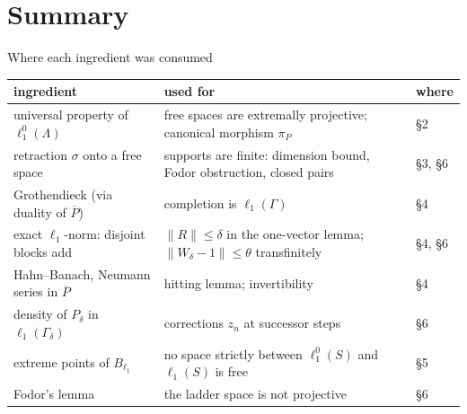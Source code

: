 \documentclass[10pt,aspectratio=169]{beamer}
\newcommand{\lo}[1]{\ell_1^0(#1)}
\newcommand{\ellone}[1]{\ell_1(#1)}
\begin{document}
\section{Summary}

\begin{frame}{Where each ingredient was consumed}
  \small
  \renewcommand{\arraystretch}{1.3}
  \begin{tabular}{@{}p{}p{}p{}@{}}
    \toprule
    ingredient & used for & where\\
    \midrule
    universal property of $\lo\Lambda$ & free spaces are extremally projective;
      canonical morphism $\pi_P$ & \S2\\
    retraction $\sigma$ onto a free space & supports are finite: dimension bound,
      Fodor obstruction, closed pairs & \S3, \S6\\
    Grothendieck (via duality of $\overline P$) & completion is $\ellone\Gamma$ & \S4\\
    exact $\ell_1$-norm: disjoint blocks add & $\|R\|\le\delta$ in the one-vector lemma;
      $\|W_\delta-1\|\le\theta$ transfinitely & \S4, \S6\\
    Hahn--Banach, Neumann series in $\overline P$ & hitting lemma; invertibility & \S4\\
    density of $P_\delta$ in $\ellone{\Gamma_\delta}$ & corrections $z_n$ at
      successor steps & \S6\\
    extreme points of $B_{\ell_1}$ & no space strictly between $\lo S$ and $\ellone S$ is free & \S5\\
    Fodor's lemma & the ladder space is not projective & \S6\\
    \bottomrule
  \end{tabular}
\end{frame}
\end{document}
